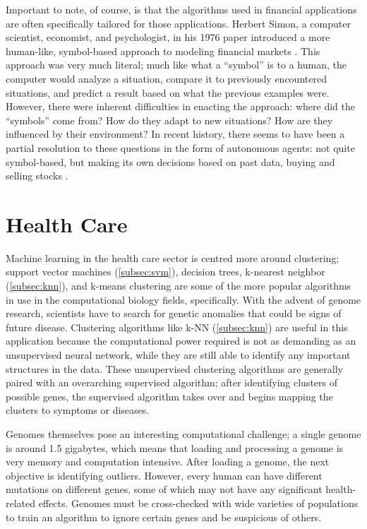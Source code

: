 \documentclass[a4paper]{comjnl}
\numberwithin{equation}{subsection}
\begin{document}
        Important to note, of course, is that the algorithms used in financial applications are
        often specifically tailored for those applications. Herbert Simon, a computer scientist,
        economist, and psychologist, in his 1976 paper introduced a more human-like, symbol-based
        approach to modeling financial markets \cite{simonh}. This approach was very much literal;
        much like what a ``symbol'' is to a human, the computer would analyze a situation, compare
        it to previously encountered situations, and predict a result based on what the previous
        examples were. However, there were inherent difficulties in enacting the approach: where did
        the ``symbols'' come from? How do they adapt to new situations? How are they influenced by
        their environment? In recent history, there seems to have been a partial resolution to these
        questions in the form of autonomous agents: not quite symbol-based, but making its own
        decisions based on past data, buying and selling stocks \cite{chens, calvacanter}.


    \section{Health Care}

        Machine learning in the health care sector is centred more around clustering; support vector
        machines (\ref{subsec:svm}), decision trees, k-nearest neighbor (\ref{subsec:knn}), and
        k-means clustering are some of the more popular algorithms in use in the computational
        biology fields, specifically. With the advent of genome research, scientists have to search
        for genetic anomalies that could be signs of future disease. Clustering algorithms like k-NN
        (\ref{subsec:knn}) are useful in this application because the computational power required
        is not as demanding as an unsupervised neural network, while they are still able to identify
        any important structures in the data. These unsupervised clustering algorithms are generally
        paired with an overarching supervised algorithm; after identifying clusters of possible
        genes, the supervised algorithm takes over and begins mapping the clusters to symptoms
        or diseases.

        Genomes themselves pose an interesting computational challenge; a single genome is around
        1.5 gigabytes, which means that loading and processing a genome is very memory and
        computation intensive. After loading a genome, the next objective is identifying outliers.
        However, every human can have different mutations on different genes, some of which may not
        have any significant health-related effects. Genomes must be cross-checked with wide
        varieties of populations to train an algorithm to ignore certain genes and be suspicious of
        others.
\end{document}
